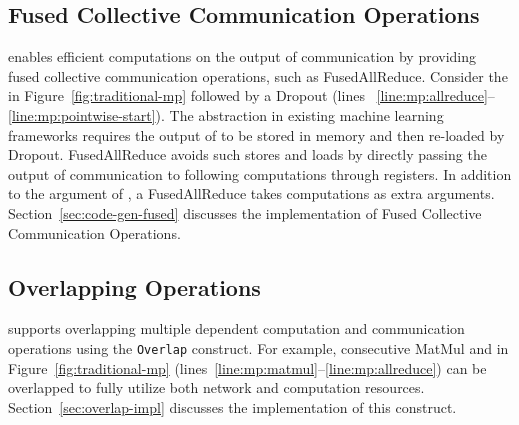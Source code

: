 
\subsection{Fused Collective Communication Operations}
\label{sec:fuse-comm-coll}
\tool enables efficient computations on the output of communication by providing fused collective communication operations, such as FusedAllReduce.
Consider the \allreduce in Figure~\ref{fig:traditional-mp} followed by a Dropout (lines ~\ref{line:mp:allreduce}--\ref{line:mp:pointwise-start}).
The abstraction in existing machine learning frameworks requires the output of \allreduce 
to be stored in memory and then re-loaded by Dropout.
FusedAllReduce avoids such stores and loads by directly passing the output of communication to following computations through registers.
In addition to the argument of \allreduce, a FusedAllReduce takes computations as extra arguments.
Section~\ref{sec:code-gen-fused} discusses the implementation of Fused Collective Communication Operations.

\subsection{Overlapping Operations}
\label{sec:overlap-comm-coll}
\tool supports overlapping multiple dependent computation and communication operations using the \texttt{Overlap} construct.
For example, consecutive MatMul and \allreduce in Figure~\ref{fig:traditional-mp} 
(lines~\ref{line:mp:matmul}--\ref{line:mp:allreduce}) can be overlapped to fully utilize both network and computation resources.
Section~\ref{sec:overlap-impl} discusses the implementation of this construct.

